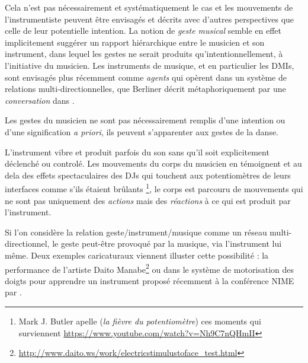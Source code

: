 Cela n'est pas nécessairement et systématiquement le cas et les mouvements de l'instrumentiste peuvent être envisagés et décrits avec d'autres perspectives que celle de leur potentielle intention.  La notion de \textit{geste musical} semble en effet implicitement suggérer un rapport hiérarchique entre le musicien et son instrument, dans lequel les gestes ne serait produits qu'intentionnellement, à l'initiative du musicien. Les instruments de musique, et en particulier les DMIs, sont envisagés plus récemment comme \textit{agents} qui opèrent dans un système de relations multi-directionnelles, que Berliner décrit métaphoriquement par une \textit{conversation} dans \cite{berliner_thinking_2009}.  



Les gestes du musicien ne sont pas nécessairement remplis d'une intention ou d'une signification \textit{a priori}, ils peuvent s'apparenter aux gestes de la danse.




L'instrument vibre et produit parfois du son sans qu'il soit explicitement déclenché ou controlé. Les mouvements du corps du musicien en témoignent et au dela des effets spectaculaires des DJs qui touchent aux potentiomètres de leurs interfaces comme s'ils étaient brûlants \footnote{Mark J. Butler apelle  (\textit{la fièvre du potentiomètre}) ces moments qui surviennent  \cite{butler_playing_2014} \url{https://www.youtube.com/watch?v=Nh9C7nQHmII}}, le corps est parcouru de mouvements qui ne sont pas uniquement des \textit{actions} mais des \textit{réactions} à ce qui est produit par l'instrument. 


Si l'on considère la relation geste/instrument/musique comme un réseau multi-directionnel, le geste peut-être provoqué par la musique, via l'instrument lui même. Deux exemples caricaturaux viennent illuster cette possibilité : la performance  de l'artiste Daito Manabe\footnote{\url{http://www.daito.ws/work/electricstimulustoface_test.html}} ou dans le système de motorisation des doigts pour apprendre un instrument proposé récemment à la conférence NIME par \cite{zhang_adaptive_2019}.



